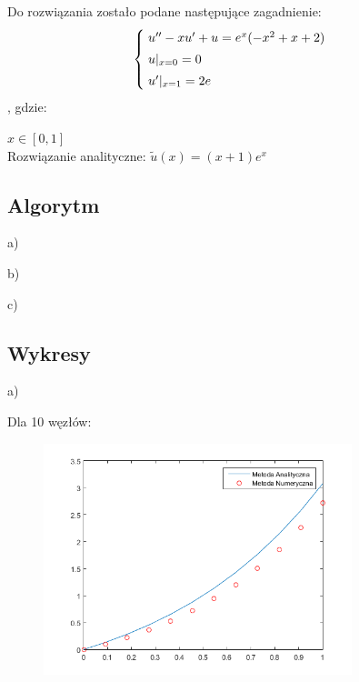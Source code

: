 Do rozwiązania zostało podane następujące zagadnienie:
\[
\begin{cases}
\vspace{0.1cm} 
\hspace{0,1cm}u''-xu' + u=e^x(-x^2+x+2) \\
\vspace{0.1cm}
\hspace{0,1cm}u|_{x=0}=0 \\
\hspace{0,1cm}u'|_{x=1}=2e
\end{cases}
\]
, gdzie:

$x\in [0,1]$
\\
Rozwiązanie analityczne: $\widetilde{u}(x) = (x+1)e^x$

\subsection{Algorytm}

\begin{samepage}
a)

\end{samepage}
\newpage
\begin{samepage}
b)

\end{samepage}
\newpage
\begin{samepage}
c)

\end{samepage}

\newpage

\subsection{Wykresy}

a)

\begin{samepage}
	Dla 10 węzłów:
	
	\FloatBarrier
	\begin{figure}[!ht]
		\begin{center}
			\includegraphics[width=0.8\textwidth]{Lab4/charts/zad4/a/10.png}
		\end{center}
	\end{figure}
	\FloatBarrier
\end{samepage}

